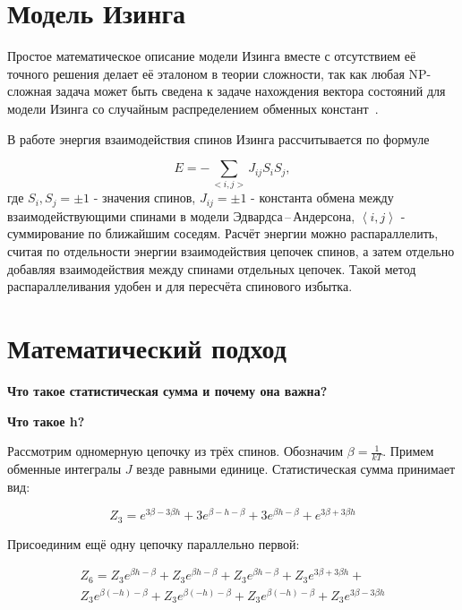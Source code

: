 \documentclass[10pt]{article}
\begin{document}
	\section{Модель Изинга}
	Простое математическое описание модели Изинга вместе с отсутствием её точного решения делает её эталоном в теории сложности, так как любая NP-сложная задача может быть сведена к задаче нахождения вектора состояний для модели Изинга со случайным распределением обменных констант~\cite{Markovich2019, papadimitriou1977euclidean, karp2010reducibility}.
	
	В работе энергия взаимодействия спинов Изинга рассчитывается по формуле
	
	\begin{equation}
		E = -\sum\limits_{<i,j>} J_{ij} S_i S_j,
	\end{equation}
	где $S_i, S_j = \pm 1$ - значения спинов, $J_{ij} = \pm 1$ - константа обмена между взаимодействующими спинами в модели Эдвардса\,--\,Андерсона, $\left\langle i,j \right\rangle$ - суммирование по ближайшим соседям. Расчёт энергии можно распараллелить, считая по отдельности энергии взаимодействия цепочек спинов, а затем отдельно добавляя взаимодействия между спинами отдельных цепочек. Такой метод распараллеливания удобен и для пересчёта спинового избытка.
	
	\section{Математический подход}
	
	\textbf{Что такое статистическая сумма и почему она важна?}
	
	\textbf{Что такое h?}
	
	
	Рассмотрим одномерную цепочку из трёх спинов. Обозначим $\beta = \frac{1}{kT}$. Примем обменные интегралы $J$ везде равными единице. Статистическая сумма принимает вид:
	
	\begin{equation}
		Z_3 = e^{3\beta - 3\beta h} + 3e^{\beta - h - \beta} + 3e^{\beta h - \beta} + e^{3\beta + 3\beta h}
		\label{eq:stat_3}
	\end{equation}
	
	Присоединим ещё одну цепочку параллельно первой:
	
	\begin{equation}
		\label{eq:stat_3_un}
		\begin{alignedat}{2}
			Z_6 = Z_3 e^{\beta  h-\beta }+Z_3 e^{\beta  h-\beta }+Z_3 e^{\beta  h-\beta }+Z_3 e^{3 \beta +3 \beta  h}+ \\
			Z_3 e^{\beta  (-h)-\beta }+Z_3 e^{\beta  (-h)-\beta }+Z_3 e^{\beta  (-h)-\beta }+Z_3 e^{3 \beta -3 \beta  h}
		\end{alignedat}
	\end{equation}
	
\end{document}
